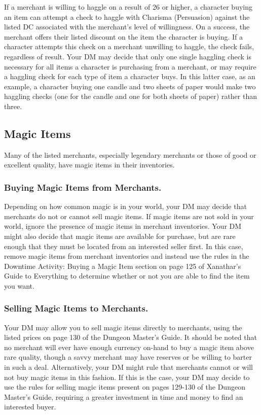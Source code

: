 \documentclass[10pt,a4paper,twoside,twocolumn,openany,nodeprecatedcode,bg=print]{dndbook}
\begin{document}
If a merchant is willing to haggle on a result of 26 or higher, a character buying an item can attempt a check to haggle with Charisma (Persuasion) against the listed DC associated with the merchant's level of willingness. On a success, the merchant offers their listed discount on the item the character is buying. If a character attempts this check on a merchant unwilling to haggle, the check fails, regardless of result.
Your DM may decide that only one single haggling check is necessary for all items a character is purchasing from a merchant, or may require a haggling check for each type of item a character buys. In this latter case, as an example, a character buying one candle and two sheets of paper would make two haggling checks (one for the candle and one for both sheets of paper) rather than three.
\subsection{Magic Items}
Many of the listed merchants, especially legendary merchants or those of good or excellent quality, have magic items in their inventories.
\subsubsection{Buying Magic Items from Merchants.}
Depending on how common magic is in your world, your DM may decide that merchants do not or cannot sell magic items. If magic items are not sold in your world, ignore the presence of magic items in merchant inventories.
Your DM might also decide that magic items are available for purchase, but are rare enough that they must be located from an interested seller first. In this case, remove magic items from merchant inventories and instead use the rules in the Downtime Activity: Buying a Magic Item section on page 125 of Xanathar's Guide to Everything to determine whether or not you are able to find the item you want.
\subsubsection{Selling Magic Items to Merchants.}
Your DM may allow you to sell magic items directly to merchants, using the listed prices on page 130 of the Dungeon Master's Guide. It should be noted that no merchant will ever have enough currency on-hand to buy a magic item above rare quality, though a savvy merchant may have reserves or be willing to barter in such a deal.
Alternatively, your DM might rule that merchants cannot or will not buy magic items in this fashion. If this is the case, your DM may decide to use the rules for selling magic items present on pages 129-130 of the Dungeon Master's Guide, requiring a greater investment in time and money to find an interested buyer.
\end{document}
